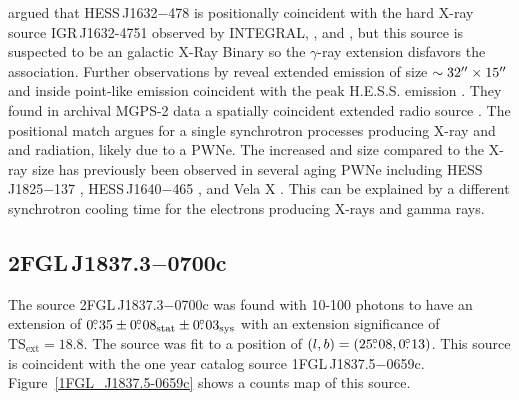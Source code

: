 \documentclass[12pt,preprint]{aastex}
\newcommand{\gev}{\text{GeV}\xspace}
\newcommand{\tev}{\text{TeV}\xspace}
\newcommand{\tsext}{{\ensuremath{\text{TS}_{\text{ext}}}}\xspace}
\newcommand{\asca}{\text{{\em ASCA}}\xspace}
\newcommand{\xmmnewton}{\text{{\em XMM-Newton}}\xspace}
\newcommand{\sys}{\text{sys}\xspace}
\newcommand{\stat}{\text{stat}\xspace}
\newcommand{\hl}[1]{#1}
\begin{document}
\hl{
\cite{hess_plane_survey} argued that HESS\,J1632$-$478
is positionally coincident with the hard X-ray source
IGR\,J1632-4751 observed by INTEGRAL, \xmmnewton, and \asca
\citep{Igr_J16320-4751_circ,xmm_newton_IGR_J16320-4751,asca_plane_survey},
but this source is suspected to be an galactic X-Ray Binary so the $\gamma$-ray
extension disfavors the association.  Further observations by
\xmmnewton reveal extended emission of size $\sim32\mbox{$^{\prime\prime}$}\times15\mbox{$^{\prime\prime}$}$
and inside point-like emission coincident with the peak
H.E.S.S. emission \citep{hess_j1632_478_xmm_newton}.  They found
in archival MGPS-2 data a spatially coincident extended radio source
\citep{most_survey_galactic_plane}.  The positional match argues for a
single synchrotron processes producing X-ray and \gev and \tev radiation,
likely due to a PWNe.  The increased \gev and \tev size compared
to the X-ray size has previously been observed in several aging PWNe
including HESS\,J1825$-$137 \citep{hess_j1825_xmm_newton,hess_j1825_hess},
HESS\,J1640$-$465 \citep{hess_plane_survey,xmm_newton_hess_j_1640-466},
and Vela X \citep{vela_x_rosat,vela_x_hess}.  This can be explained by
a different synchrotron cooling time for the electrons producing X-rays
and \tev gamma rays.
}

\subsection{2FGL\,J1837.3$-$0700c}
\label{section_2FGL_J1837.3-0700c}




The source 2FGL\,J1837.3$-$0700c was found with 10-100 \gev photons to
have an extension of $0\fdg35\pm0\fdg08_\stat\pm0\fdg03_\sys$ with an
extension significance of $\tsext=18.8$.  The source was fit to a position
of $(l,b)=(25\mbox{$.\!\!^\circ$}08,0\mbox{$.\!\!^\circ$}13)$.  This source is coincident with the one
year catalog source 1FGL\,J1837.5$-$0659c.  Figure~\ref{1FGL_J1837.5-0659c}
shows a counts map of this source.
\end{document}
